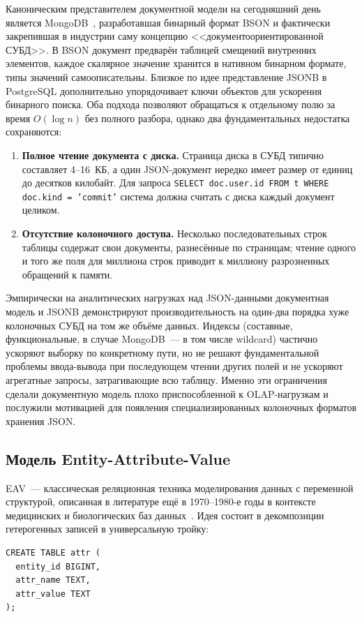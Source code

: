 Каноническим представителем документной модели на сегодняшний день
является MongoDB~\cite{mongodb-bson}, разработавшая бинарный формат
BSON и фактически закрепившая в индустрии саму концепцию
<<документоориентированной СУБД>>. В BSON документ предварён
таблицей смещений внутренних элементов, каждое скалярное значение
хранится в нативном бинарном формате, типы значений
самоописательны. Близкое по идее представление JSONB в PostgreSQL
дополнительно упорядочивает ключи объектов для ускорения бинарного
поиска. Оба подхода позволяют обращаться к отдельному полю за время
$O(\log n)$ без полного разбора, однако два фундаментальных
недостатка сохраняются:

\begin{enumerate}
    \item \textbf{Полное чтение документа с диска.} Страница диска в
    СУБД типично составляет 4--16~КБ, а один JSON-документ нередко
    имеет размер от единиц до десятков килобайт. Для запроса
    \texttt{SELECT doc.user.id FROM t WHERE doc.kind = 'commit'}
    система должна считать с диска каждый документ целиком.
    \item \textbf{Отсутствие колоночного доступа.} Несколько
    последовательных строк таблицы содержат свои документы,
    разнесённые по страницам; чтение одного и того же поля для
    миллиона строк приводит к миллиону разрозненных обращений к
    памяти.
\end{enumerate}

Эмпирически на аналитических нагрузках над JSON-данными
документная модель и JSONB демонстрируют производительность на
один-два порядка хуже колоночных СУБД на том же объёме данных.
Индексы (составные, функциональные, в случае MongoDB~--- в том
числе wildcard) частично ускоряют выборку по конкретному пути, но
не решают фундаментальной проблемы ввода-вывода при последующем
чтении других полей и не ускоряют агрегатные запросы,
затрагивающие всю таблицу. Именно эти ограничения сделали
документную модель плохо приспособленной к OLAP-нагрузкам и
послужили мотивацией для появления специализированных колоночных
форматов хранения JSON.

\subsection{Модель Entity-Attribute-Value}

EAV~--- классическая реляционная техника моделирования данных с
переменной структурой, описанная в литературе ещё в 1970--1980-е
годы в контексте медицинских и биологических баз
данных~\cite{stead1983,nadkarni2007}. Идея состоит в декомпозиции
гетерогенных записей в универсальную тройку:
\begin{verbatim}
CREATE TABLE attr (
  entity_id BIGINT,
  attr_name TEXT,
  attr_value TEXT
);
\end{verbatim}

